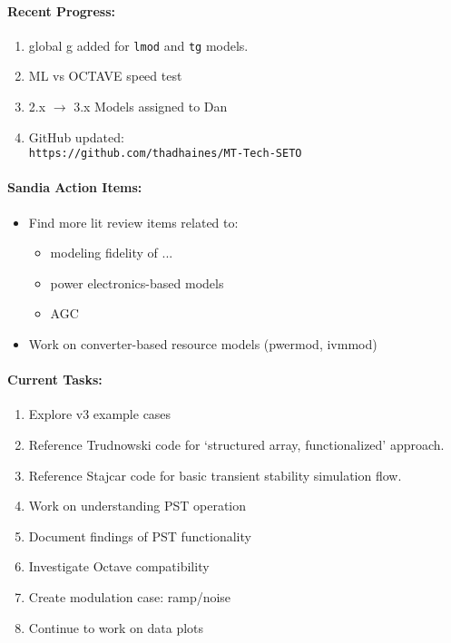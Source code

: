 \documentclass[12pt]{article}
\begin{document}
\begin{multicols}{2}
\raggedright

\paragraph{Recent Progress:}
	\begin{enumerate}
		\itemsep0em 
		\item global g added for \verb|lmod| and \verb|tg| models.
		\item ML vs OCTAVE speed test
		\item 2.x $\longrightarrow$ 3.x Models assigned to Dan
		\item GitHub updated:\\
	{\footnotesize	\verb|https://github.com/thadhaines/MT-Tech-SETO| }\\
	\end{enumerate}
	

\paragraph{Sandia Action Items:}
	\begin{itemize}
		\itemsep 0em 
		\item Find more lit review items related to:
			\begin{itemize}
			\itemsep 0em 
			\item modeling fidelity of ...
			\item power electronics-based models
			\item AGC
			\end{itemize}
		\item Work on converter-based resource models (pwermod, ivmmod)
	\end{itemize}

	
\paragraph{Current Tasks:}
	\begin{enumerate}
		\itemsep 0em 
		\item Explore v3 example cases
		\item Reference Trudnowski code for `structured array, functionalized' approach.
		\item Reference Stajcar code for basic transient stability simulation flow.
		\item Work on understanding PST operation
		\item Document findings of PST functionality
		\item Investigate Octave compatibility
		\item Create modulation case: ramp/noise 
		\item Continue to work on data plots 
\end{enumerate}


\end{multicols}
\end{document}
